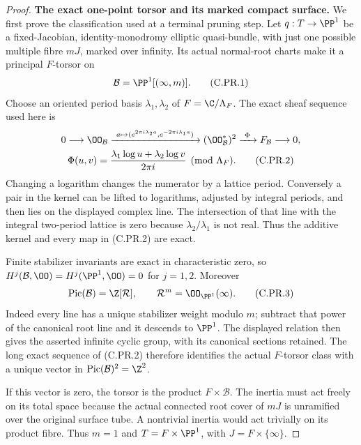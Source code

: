\begin{proof}
\par\medskip\noindent\textbf{The exact one-point torsor and its marked compact surface.}
We first prove the classification used at a terminal pruning step.
Let $q:T\to\PP^1$ be a fixed-Jacobian, identity-monodromy elliptic
quasi-bundle, with just one possible multiple fibre $mJ$, marked
over infinity. Its actual normal-root charts make it a principal
$F$-torsor on
\[
                 \mathcal B=\PP^1[(\infty,m)].          \tag{C.PR.1}
\]
Choose an oriented period basis $\lambda_1,\lambda_2$ of
$F=\C/\Lambda_F$. The exact sheaf sequence used here is
\[
 \begin{gathered}
 0\longrightarrow\OO_{\mathcal B}
 \xrightarrow{\ a\mapsto
 (e^{2\pi i\lambda_2a},e^{-2\pi i\lambda_1a})\ }
 (\OO_{\mathcal B}^{*})^2
 \xrightarrow{\ \Phi\ }F_{\mathcal B}\longrightarrow0,\\
 \Phi(u,v)=
 \frac{\lambda_1\log u+\lambda_2\log v}{2\pi i}
                          \pmod{\Lambda_F}.            \tag{C.PR.2}
 \end{gathered}
\]
Changing a logarithm changes the numerator by a lattice period.
Conversely a pair in the kernel can be lifted to logarithms,
adjusted by integral periods, and then lies on the displayed
complex line. The intersection of that line with the integral
two-period lattice is zero because
$\lambda_2/\lambda_1$ is not real. Thus the additive kernel and
every map in (C.PR.2) are exact.

Finite stabilizer invariants are exact in characteristic zero, so
$H^j(\mathcal B,\OO)=H^j(\PP^1,\OO)=0$ for $j=1,2$.
Moreover
\[
 \operatorname{Pic}(\mathcal B)=\Z[\mathcal R],
                 \qquad \mathcal R^m=\OO_{\PP^1}(\infty).
                                                        \tag{C.PR.3}
\]
Indeed every line has a unique stabilizer weight modulo $m$;
subtract that power of the canonical root line and it descends
to $\PP^1$. The displayed relation then gives the asserted
infinite cyclic group, with its canonical sections retained.
The long exact sequence of (C.PR.2) therefore identifies the
actual $F$-torsor class with a unique vector in
$\operatorname{Pic}(\mathcal B)^2=\Z^2$.

If this vector is zero, the torsor is the product
$F\times\mathcal B$. The inertia must act freely on its total
space because the actual connected root cover of $mJ$ is
unramified over the original surface tube. A nontrivial inertia
would act trivially on its product fibre. Thus $m=1$ and
$T=F\times\PP^1$, with $J=F\times\{\infty\}$.


\end{proof}
